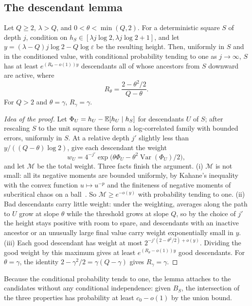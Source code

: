 \subsection{The descendant lemma}

\begin{lemma}\label{lem:desc}
Let $Q\ge2$, $\lambda>Q$, and $0<\theta<\min(Q,2)$. For a deterministic square $S$ of depth $j$,
condition on $h_S\in[\lambda j\log2,\lambda j\log2+1]$, and let $y=(\lambda-Q)j\log2-Q\log\varepsilon$
be the resulting height. Then, uniformly in $S$ and in the conditioned value, with conditional
probability tending to one as $j\to\infty$, $S$ has at least $e^{(R_\theta-o(1))y}$ descendants
all of whose ancestors from $S$ downward are active, where
\[
R_\theta=\frac{2-\theta^2/2}{Q-\theta}.
\]
For $Q>2$ and $\theta=\gamma$, $R_\gamma=\gamma$.
\end{lemma}

\begin{proof}[Idea of the proof]
Let $\Phi_U=h_U-\mathbb{E}[h_U\mid h_S]$ for descendants $U$ of $S$; after rescaling $S$ to the unit square
these form a log-correlated family with bounded errors, uniformly in $S$. At a relative depth $j'$
slightly less than $y/((Q-\theta)\log2)$, give each descendant the weight
\[
w_U=4^{-j'}\exp\bigl(\theta \Phi_U-\theta^2\operatorname{Var}(\Phi_U)/2\bigr),
\]
and let $\mathcal M$ be the total weight. Three facts finish the argument.
(i) $\mathcal M$ is not small: all its negative moments are bounded uniformly, by Kahane's inequality with
the convex function $u\mapsto u^{-p}$ and the finiteness of negative moments of subcritical chaos
on a ball~\cite[Theorem~2.12]{RV}. So $\mathcal M\ge e^{-o(y)}$ with probability tending to one.
(ii) Bad descendants carry little weight: under the weighting, averages along the path to $U$
grow at slope $\theta$ while the threshold grows at slope $Q$, so by the choice of $j'$ the height
stays positive with room to spare, and descendants with an inactive ancestor or an unusually large
final value carry weight exponentially small in $y$.
(iii) Each good descendant has weight at most $2^{-j'(2-\theta^2/2)+o(y)}$. Dividing the good weight
by this maximum gives at least $e^{(R_\theta-o(1))y}$ good descendants. For $\theta=\gamma$, the
identity $2-\gamma^2/2=\gamma(Q-\gamma)$ gives $R_\gamma=\gamma$.
\end{proof}

Because the conditional probability tends to one, the lemma attaches to the candidates without
any conditional independence: given $B_S$, the intersection of the three properties has
probability at least $c_0-o(1)$ by the union bound.

